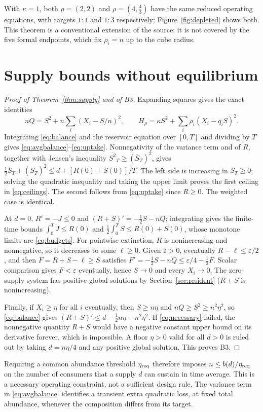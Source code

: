 \documentclass[11pt,a4paper]{article}
\theoremstyle{plain}
\theoremstyle{definition}
\theoremstyle{remark}
\newcommand{\avg}[1]{\overline{#1}_T}
\newcommand{\eps}{\varepsilon}
\begin{document}
With $\kappa=1$, both $\rho=(2,2)$ and $\rho=(4,\tfrac43)$ have the same reduced operating equations, with targets $1{:}1$ and $1{:}3$ respectively; Figure~\ref{fig:depleted} shows both. This theorem is a conventional extension of the source; it is not covered by the five formal endpoints, which fix $\rho_i=n$ up to the cube radius.

\section{Supply bounds without equilibrium}\label{sec:supply}
\begin{proof}[Proof of Theorem~\ref{thm:supply} and of B3]
Expanding squares gives the exact identities
\[
nQ=S^2+n\sum_i(X_i-S/n)^2,\qquad H_\rho=\kappa S^2+\sum_i\rho_i(X_i-q_iS)^2 .
\]
Integrating \eqref{eq:balance} and the reservoir equation over $[0,T]$ and dividing by $T$ gives \eqref{eq:avgbalance}--\eqref{eq:uptake}. Nonnegativity of the variance term and of $R$, together with Jensen's inequality $\avg{S^2}\ge(\avg S)^2$, gives $\tfrac12\avg S+(\avg S)^2\le d+[R(0)+S(0)]/T$. The left side is increasing in $\avg S\ge0$; solving the quadratic inequality and taking the upper limit proves the first ceiling in \eqref{eq:ceilings}. The second follows from \eqref{eq:uptake} since $R\ge0$. The weighted case is identical.

At $d=0$, $R'=-J\le0$ and $(R+S)'=-\tfrac12S-nQ$; integrating gives the finite-time bounds $\int_0^TJ\le R(0)$ and $\tfrac12\int_0^TS\le R(0)+S(0)$, whose monotone limits are \eqref{eq:budgets}. For pointwise extinction, $R$ is nonincreasing and nonnegative, so it decreases to some $\ell\ge0$. Given $\eps>0$, eventually $R-\ell\le\eps/2$, and then $F=R+S-\ell\ge S$ satisfies $F'=-\tfrac12S-nQ\le\eps/4-\tfrac12F$. Scalar comparison gives $F<\eps$ eventually, hence $S\to0$ and every $X_i\to0$. The zero-supply system has positive global solutions by Section~\ref{sec:resident} ($R+S$ is nonincreasing).

Finally, if $X_i\ge\eta$ for all $i$ eventually, then $S\ge n\eta$ and $nQ\ge S^2\ge n^2\eta^2$, so \eqref{eq:balance} gives $(R+S)'\le d-\tfrac12n\eta-n^2\eta^2$. If \eqref{eq:necessary} failed, the nonnegative quantity $R+S$ would have a negative constant upper bound on its derivative forever, which is impossible. A floor $\eta>0$ valid for all $d>0$ is ruled out by taking $d=n\eta/4$ and any positive global solution. This proves B3.
\end{proof}

Requiring a common abundance threshold $\eta_{\rm req}$ therefore imposes $n\le b(d)/\eta_{\rm req}$ on the number of consumers that a supply $d$ can sustain in time average. This is a necessary operating constraint, not a sufficient design rule. The variance term in \eqref{eq:avgbalance} identifies a transient extra quadratic loss, at fixed total abundance, whenever the composition differs from its target.
\end{document}
